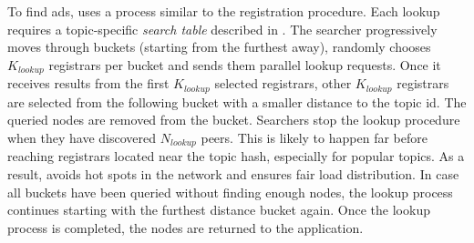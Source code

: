 To find ads, \sysname uses a process similar to the registration procedure. 
Each lookup requires a topic-specific \emph{search table} described in .
The searcher progressively moves through buckets (starting from the furthest away), randomly chooses $K_\textit{lookup}$ registrars per bucket and sends them parallel lookup requests. 
Once it receives results from the first $K_\textit{lookup}$ selected registrars, other $K_\textit{lookup}$ registrars are selected from the following bucket with a smaller distance to the topic id.
The queried nodes are removed from the bucket. 
Searchers stop the lookup procedure when they have discovered $N_\textit{lookup}$ peers. This is likely to happen far before reaching registrars located near the topic hash, especially for popular topics. As a result, \sysname avoids hot spots in the network and ensures fair load distribution. 
In case all buckets have been queried without finding enough nodes, the lookup process continues starting with the furthest distance bucket again. 
Once the lookup process is completed, the nodes are returned to the application.


